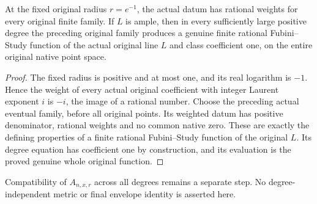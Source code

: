 \begin{corollary}\label{cor:native-tc-original-rational-fs-families}
\leanok
At the fixed original radius $r=e^{-1}$, the actual datum has rational
weights for every original finite family. If $L$ is ample, then in
every sufficiently large positive degree the preceding original family
produces a genuine finite rational Fubini--Study function of the
actual original line $L$ and class coefficient one, on the entire
original native point space.
\end{corollary}
\begin{proof}
The fixed radius is positive and at most one, and its real logarithm
is $-1$. Hence the weight of every actual original coefficient with
integer Laurent exponent $i$ is $-i$, the image of a rational number.
Choose the preceding actual eventual family, before all original
points. Its weighted datum has positive denominator, rational weights
and no common native zero. These are exactly the defining properties
of a finite rational Fubini--Study function of the original $L$.
Its degree equation has coefficient one by construction, and its
evaluation is the proved genuine whole original function.
\end{proof}

\begin{remark}
Compatibility of $A_{n,x,r}$ across all degrees remains a separate step.
No degree-independent metric or final envelope identity is asserted here.
\end{remark}
